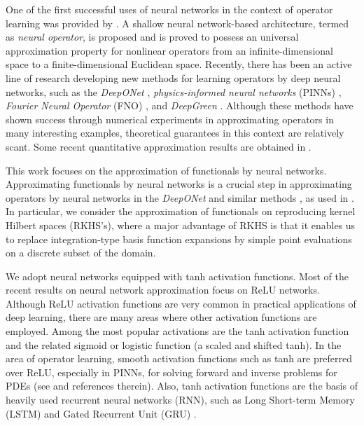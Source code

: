 \documentclass{article}
\numberwithin{equation}{section}
\begin{document}
One of the first successful uses of neural networks in the context of operator learning was provided by \citep{chen1995universal}. A shallow neural network-based architecture, termed as \textit{neural operator}, is proposed and is proved to possess an universal approximation property for nonlinear operators from an infinite-dimensional space to a finite-dimensional Euclidean space.
Recently, there has been an active line of research developing new methods for learning operators by deep neural networks, such as the \textit{DeepONet} \citep{lu2021learning}, \textit{physics-informed neural networks} (PINNs) \citep{raissi2019physics, wang2021learning}, \textit{Fourier Neural Operator} (FNO) \citep{li2020fourier}, and \textit{DeepGreen} \citep{gin2021deepgreen}.
Although these methods have shown success through numerical experiments in approximating operators in many interesting examples, theoretical guarantees in this context are relatively scant. 
Some recent quantitative approximation results are obtained in \citep{kovachki2021universal, lanthaler2022error, liu2022deep}. 

This work focuses on the approximation of functionals by neural networks.
Approximating functionals by neural networks is a crucial step in approximating operators by neural networks in the \textit{DeepONet} and similar methods \citep{lanthaler2022error}, as used in \citep{chen1995universal}. 
In particular, we consider the approximation of functionals on reproducing kernel Hilbert
spaces (RKHS's), where a major advantage of RKHS is that it enables us to replace integration-type basis function expansions by simple point evaluations on a discrete subset of the domain. 

We adopt neural networks equipped with tanh activation functions.
Most of the recent results on neural network approximation focus on  ReLU networks. 
Although ReLU activation functions are very common in practical applications of deep learning, there are many areas where other activation functions are employed.  Among the most popular activations are the tanh activation function and the related sigmoid or logistic function (a scaled and shifted tanh). 
In the area of operator learning, smooth activation functions such as tanh are preferred over ReLU, especially in  
PINNs, for solving forward and inverse problems for PDEs (see \citep{raissi2019physics} and references therein). 
Also, tanh activation functions are the basis of heavily used recurrent neural networks (RNN), such as Long Short-term Memory (LSTM) \citep{hochreiter1997long} and Gated Recurrent Unit (GRU) \citep{cho2014learning}. 
\end{document}
